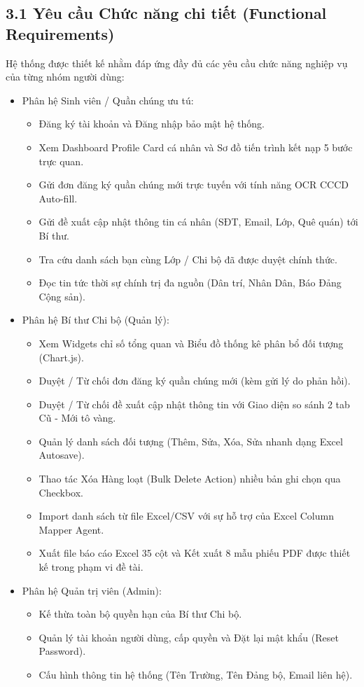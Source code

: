 \documentclass[12pt,a4paper]{report}
\begin{document}
\subsection*{3.1 Yêu cầu Chức năng chi tiết (Functional Requirements)}
Hệ thống được thiết kế nhằm đáp ứng đầy đủ các yêu cầu chức năng nghiệp vụ của từng nhóm người dùng:
\begin{itemize}[label=--,leftmargin=*]
  \item Phân hệ Sinh viên / Quần chúng ưu tú:
        \begin{itemize}[label=--,leftmargin=*]
          \item Đăng ký tài khoản và Đăng nhập bảo mật hệ thống.
          \item Xem Dashboard Profile Card cá nhân và Sơ đồ tiến trình kết nạp 5 bước trực quan.
          \item Gửi đơn đăng ký quần chúng mới trực tuyến với tính năng OCR CCCD Auto-fill.
          \item Gửi đề xuất cập nhật thông tin cá nhân (SĐT, Email, Lớp, Quê quán) tới Bí thư.
          \item Tra cứu danh sách bạn cùng Lớp / Chi bộ đã được duyệt chính thức.
          \item Đọc tin tức thời sự chính trị đa nguồn (Dân trí, Nhân Dân, Báo Đảng Cộng sản).
        \end{itemize}
  \item Phân hệ Bí thư Chi bộ (Quản lý):
        \begin{itemize}[label=--,leftmargin=*]
          \item Xem Widgets chỉ số tổng quan và Biểu đồ thống kê phân bổ đối tượng (Chart.js).
          \item Duyệt / Từ chối đơn đăng ký quần chúng mới (kèm gửi lý do phản hồi).
          \item Duyệt / Từ chối đề xuất cập nhật thông tin với Giao diện so sánh 2 tab Cũ - Mới tô vàng.
          \item Quản lý danh sách đối tượng (Thêm, Sửa, Xóa, Sửa nhanh dạng Excel Autosave).
          \item Thao tác Xóa Hàng loạt (Bulk Delete Action) nhiều bản ghi chọn qua Checkbox.
          \item Import danh sách từ file Excel/CSV với sự hỗ trợ của Excel Column Mapper Agent.
          \item Xuất file báo cáo Excel 35 cột và Kết xuất 8 mẫu phiếu PDF được thiết kế trong phạm vi đề tài.
        \end{itemize}
  \item Phân hệ Quản trị viên (Admin):
        \begin{itemize}[label=--,leftmargin=*]
          \item Kế thừa toàn bộ quyền hạn của Bí thư Chi bộ.
          \item Quản lý tài khoản người dùng, cấp quyền và Đặt lại mật khẩu (Reset Password).
          \item Cấu hình thông tin hệ thống (Tên Trường, Tên Đảng bộ, Email liên hệ).
        \end{itemize}
\end{itemize}
\end{document}
